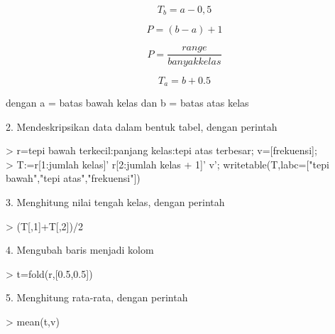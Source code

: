 \documentclass[a4paper,10pt]{article}
\begin{document}
\begin{eulernotebook}
\begin{eulercomment}
\end{eulercomment}
\begin{eulerformula}
\[
T_b=a-0,5
\]
\end{eulerformula}
\begin{eulerformula}
\[
P=(b-a)+1
\]
\end{eulerformula}
\begin{eulerformula}
\[
P=\frac{range}{banyak kelas}
\]
\end{eulerformula}
\begin{eulerformula}
\[
T_a=b+0.5
\]
\end{eulerformula}
\begin{eulercomment}
dengan a = batas bawah kelas dan b = batas atas kelas

2. Mendeskripsikan data dalam bentuk tabel, dengan perintah

\textgreater{} r=tepi bawah terkecil:panjang kelas:tepi atas terbesar;
v=[frekuensi];\\
\textgreater{} T:=r[1:jumlah kelas]' \textbar{} r[2:jumlah kelas + 1]' \textbar{} v';
writetable(T,labc=["tepi bawah","tepi atas","frekuensi"])

3. Menghitung nilai tengah kelas, dengan perintah

\textgreater{} (T[,1]+T[,2])/2

4. Mengubah baris menjadi kolom

\textgreater{} t=fold(r,[0.5,0.5])

5. Menghitung rata-rata, dengan perintah

\textgreater{} mean(t,v)


\end{eulercomment}
\end{eulernotebook}
\end{document}
